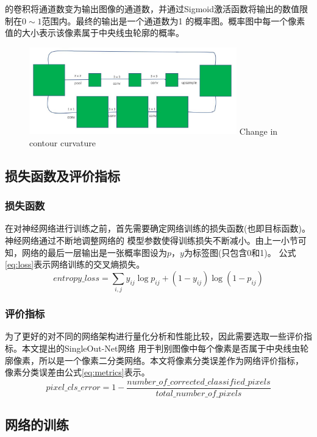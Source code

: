 	的卷积将通道数变为输出图像的通道数，并通过Sigmoid激活函数将输出的数值限制在$0\sim1$范围内。最终的输出是一个通道数为1
	的概率图。概率图中每一个像素值的大小表示该像素属于中央线虫轮廓的概率。
\begin{figure}[htb]
	  \centering
	  \includegraphics[width=9cm]{figure/chap4/residualpooling.jpg}
		{Change in contour curvature}
	  \label{fig:chap4:respool}
	\end{figure}
\subsection{损失函数及评价指标}
\subsubsection{损失函数}
	在对神经网络进行训练之前，首先需要确定网络训练的损失函数(也即目标函数)。神经网络通过不断地调整网络的
	模型参数使得训练损失不断减小。由上一小节可知，网络的最后一层输出是一张概率图设为$p$，$y$为标签图(只包含0和1)。
	公式\ref{eq:loss}表示网络训练的交叉熵损失。
	\begin{equation}
		entropy\_loss = \sum_{i,j}y_{ij}\log p_{ij} + (1-y_{ij})\log (1-p_{ij}) \label{eq:loss}
	\end{equation}
\subsubsection{评价指标}
	为了更好的对不同的网络架构进行量化分析和性能比较，因此需要选取一些评价指标。本文提出的SingleOut-Net网络
	用于判别图像中每个像素是否属于中央线虫轮廓像素，所以是一个像素二分类网络。本文将像素分类误差作为网络评价指标，
	像素分类误差由公式\ref{eq:metrics}表示。
	\begin{equation}
		pixel\_cls\_error =1- \frac{number\_of\_corrected\_classified\_pixels}{total\_number\_of\_pixels} \label{eq:metrics}
	\end{equation}
\subsection{网络的训练}
	
